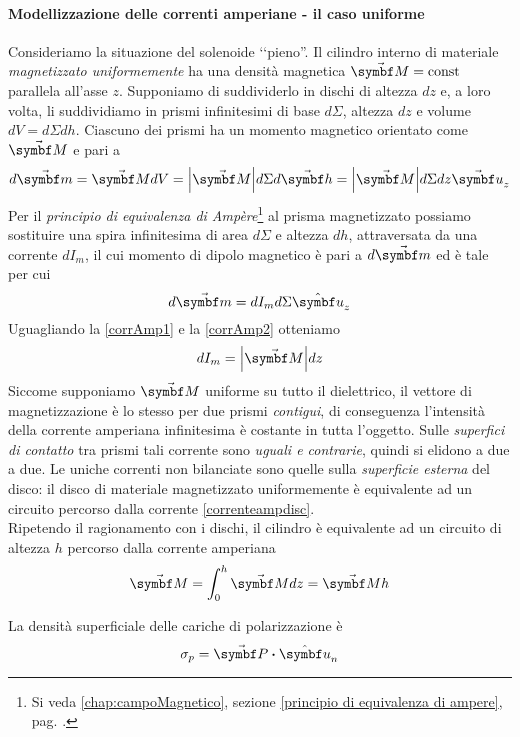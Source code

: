 \paragraph{Modellizzazione delle correnti amperiane - il caso uniforme}
Consideriamo la situazione del solenoide ‘‘pieno''. Il cilindro interno di materiale \textit{magnetizzato uniformemente} ha una densità magnetica $\vba{M}=\text{const}$ parallela all'asse $z$. Supponiamo di suddividerlo in dischi di altezza $dz$ e, a loro volta, li suddividiamo in prismi infinitesimi di base $d\Sigma$, altezza $dz$ e volume $dV=d\Sigma dh$. Ciascuno dei prismi ha un momento magnetico orientato come $\vba{M}$ e pari a
\begin{equation*}
	d\vba{m}=\vba{M}dV=\abs{\vba{M}}d\Sigma d\vba{h}=\abs{\vba{M}} d\Sigma dz\vba{u}_z\label{corrAmp1}
\end{equation*}
Per il \textit{principio di equivalenza di Ampère}\footnote{Si veda \autoref{chap:campoMagnetico}, sezione \ref{principio di equivalenza di ampere}, pag. \pageref{principio di equivalenza di ampere}.} al prisma magnetizzato possiamo sostituire una spira infinitesima di area $d\Sigma$ e altezza $dh$, attraversata da una corrente $dI_m$, il cui momento di dipolo magnetico è pari a $d\vba{m}$ ed è tale per cui
\begin{equation*}
	d\vba{m}=dI_md\Sigma \vbh{u}_z \label{corrAmp2}
\end{equation*}
Uguagliando la \eqref{corrAmp1} e la \eqref{corrAmp2} otteniamo
\begin{equation}
	dI_m=\abs{\vba{M}}dz\label{correnteampdisc}
\end{equation}
Siccome supponiamo $\vba{M}$ uniforme su tutto il dielettrico, il vettore di magnetizzazione è lo stesso per due prismi \textit{contigui}, di conseguenza l'intensità della corrente amperiana infinitesima è costante in tutta l'oggetto. Sulle \textit{superfici di contatto} tra prismi tali corrente sono \textit{uguali e contrarie}, quindi si elidono a due a due. Le uniche correnti non bilanciate sono quelle sulla \textit{superficie esterna} del disco: il disco di materiale magnetizzato uniformemente è equivalente ad un circuito percorso dalla corrente \eqref{correnteampdisc}.\\
Ripetendo il ragionamento con i dischi, il cilindro è equivalente ad un circuito di altezza $h$ percorso dalla corrente amperiana
\begin{equation}
	\vba{M}=\int_{0}^{h}\vba{M}dz=\vba{M}h
\end{equation}
\begin{remember}
	La densità superficiale delle cariche di polarizzazione è
	\begin{equation}
		\sigma_p=\vba{P}\vdot\vbh{u}_n
	\end{equation}
\end{remember}
